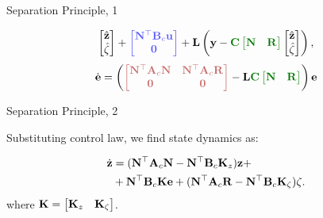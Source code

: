 \documentclass{beamer}
\begin{document}
\begin{frame}{Separation Principle, 1}
\begin{flushleft}
\begin{equation*}
\begin{bmatrix}
				\hat{\bo{z}} \\ \hat{\zeta}
			\end{bmatrix}
			+
			\textcolor{myblue}
			{\begin{bmatrix}
				\bo{N}\T\bo{B}_c\bo{u} \\ \bo{0}
			\end{bmatrix} }
			+
			\bo{L}
			\left(\bo{y} - 
			\textcolor{mydarkgreen}
			{\bo{C} 
			\begin{bmatrix}
				\bo{N} & \bo{R}
			\end{bmatrix}}
			\begin{bmatrix}
				\hat{\bo{z}} \\ \hat{\zeta}
			\end{bmatrix}
			\right),
		\end{equation*}
		\begin{equation}
			\label{e_Observer_error}
			\dot{\bo{e}} =
			\left(
			\textcolor{myred}
			{\begin{bmatrix}
				\bo{N}\T\bo{A}_c\bo{N} & \bo{N}\T\bo{A}_c\bo{R}\\ 
				\bo{0} & \bo{0}
			\end{bmatrix}}
			-
			\bo{L}
			\textcolor{mydarkgreen}
			{\bo{C} 
			\begin{bmatrix}
				\bo{N} & \bo{R}
			\end{bmatrix}}
			\right)
			\bo{e}
		\end{equation}
		
		
	\end{flushleft}
\end{frame}



\begin{frame}{Separation Principle, 2}
	\begin{flushleft}
		
		Substituting control law, we find state dynamics as:
		
		\begin{align*}
			\dot{\mathbf{z}} &= 
			(\mathbf{N}^\top\mathbf{A}_c\mathbf{N} - \mathbf{N}^\top\mathbf{B}_c 
			\mathbf{K}_z) \mathbf{z}
			+
			\\
			&+
			\mathbf{N}^\top\mathbf{B}_c\mathbf{K}
			\mathbf{e}
			+ (\mathbf{N}^\top\mathbf{A}_c\mathbf{R}
			- \mathbf{N}^\top\mathbf{B}_c \mathbf{K}_\zeta) \zeta.
		\end{align*}
		where $\mathbf{K} = \begin{bmatrix}
			\mathbf{K}_z & \mathbf{K}_\zeta
		\end{bmatrix}$.
		
		
	\end{flushleft}
\end{frame}
\end{document}
